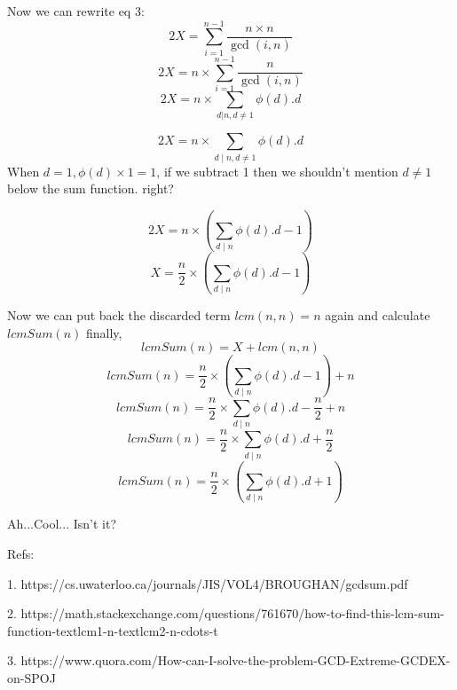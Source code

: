 \documentclass[a4paper,12pt]{article}
\begin{document}
Now we can rewrite eq 3:
$$2X = \sum_{i=1}^{n-1} \frac{ n\times n} { \gcd(i,n) }$$
$$2X = n \times \sum_{i=1}^{n-1} \frac{n} { \gcd(i,n) }$$
$$2X = n \times \sum_{d | n, d \neq 1} \phi(d) . d$$

$$2X = n \times \sum_{d\mid n, d \neq 1} \phi(d) . d$$
When $d = 1, \phi(d) \times 1 = 1$, if we subtract 1 then we shouldn't mention $d \neq 1$ below the sum function. right?

$$2X = n \times (\sum_{d\mid n} \phi(d) . d - 1)$$
$$X = \frac{n}{2} \times (\sum_{d\mid n} \phi(d) . d - 1)$$

Now we can put back the discarded term $lcm(n, n) = n$ again and calculate $lcmSum(n)$ finally,
$$lcmSum(n) = X + lcm(n, n)$$
$$lcmSum(n) = \frac{n}{2} \times (\sum_{d\mid n} \phi(d) . d - 1) + n$$
$$lcmSum(n) = \frac{n}{2} \times \sum_{d\mid n} \phi(d) . d - \frac{n}{2} + n$$
$$lcmSum(n) = \frac{n}{2} \times \sum_{d\mid n} \phi(d) . d + \frac{n}{2}$$
$$lcmSum(n) = \frac{n}{2} \times (\sum_{d\mid n} \phi(d) . d + 1)$$

Ah...Cool... Isn't it?

\bigskip
\bigskip
\bigskip
\bigskip

Refs:

1. https://cs.uwaterloo.ca/journals/JIS/VOL4/BROUGHAN/gcdsum.pdf
\bigskip

2. https://math.stackexchange.com/questions/761670/how-to-find-this-lcm-sum-function-textlcm1-n-textlcm2-n-cdots-t
\bigskip

3. https://www.quora.com/How-can-I-solve-the-problem-GCD-Extreme-GCDEX-on-SPOJ
\end{document}
